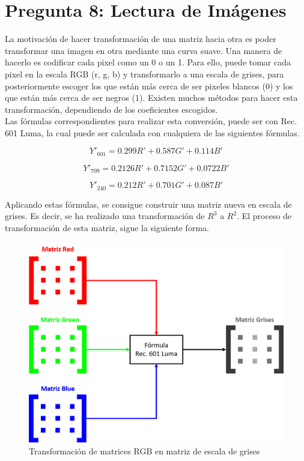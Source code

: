 \documentclass[conference]{IEEEtran}
\begin{document}
\section{Pregunta 8: Lectura de Imágenes}
La motivación de hacer transformación de una matriz hacia otra es poder transformar
una imagen en otra mediante una curva suave. Una manera de hacerlo es codificar cada pixel como un 0 o un 1. Para ello, puede tomar cada pixel en la escala RGB (r, g, b) y transformarlo a una escala de grises, para posteriormente escoger los que están más cerca de ser pixeles blancos (0) y los que están más cerca de ser negros (1). Existen muchos métodos para hacer esta transformación, dependiendo de los coeficientes escogidos.\\

Las fórmulas correspondientes para realizar esta conversión, puede ser con Rec. 601 Luma, la cual puede ser calculada con cualquiera de las siguientes fórmulas.

\begin{equation}
    Y'_{601}=0.299R'+0.587G'+0.114B'
\end{equation}

\begin{equation}
    Y'_{709}=0.2126R'+0.7152G'+0.0722B'
\end{equation}

\begin{equation}
    Y'_{240}=0.212R'+0.701G'+0.087B'
\end{equation}

Aplicando estas fórmulas, se consigue construir una matriz nueva en escala de grises. Es decir, se ha realizado una transformación de $R^3$ a $R^2$. El proceso de transformación de esta matriz, sigue la siguiente forma.

\begin{figure}[H]
  \centering
  \includegraphics[scale=0.35]{images/matriz_grises.png}
  \caption[Grises]{Transformación de matrices RGB en matriz de escala de grises}
  \label{fig:grises}
\end{figure}
\end{document}
